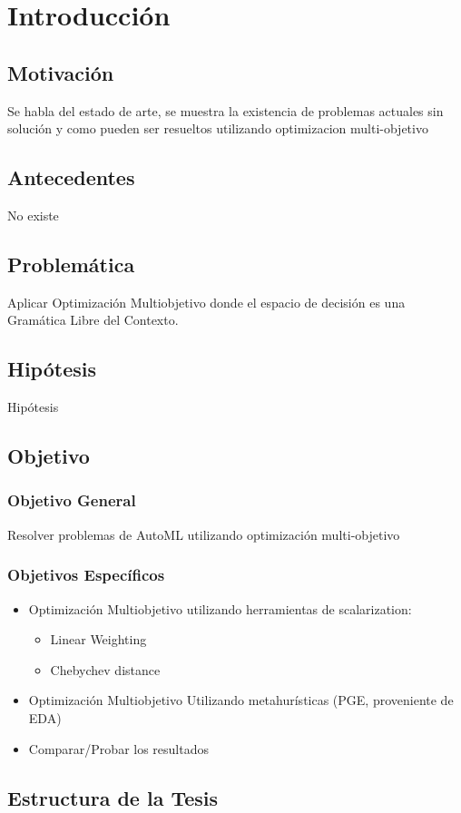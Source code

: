 \chapter*{Introducción}\label{chapter:introduction}

\section*{Motivaci\'on}
Se habla del estado de arte, se muestra la existencia de problemas actuales sin soluci\'on y como pueden ser resueltos utilizando optimizacion multi-objetivo

\section*{Antecedentes}
No existe

\section*{Problem\'atica}
Aplicar Optimizaci\'on Multiobjetivo donde el espacio de decisi\'on es una Gram\'atica Libre del Contexto.\\

\section*{Hip\'otesis}
Hip\'otesis

\section*{Objetivo}
\subsection*{Objetivo General}
Resolver problemas de AutoML utilizando optimizaci\'on multi-objetivo
\subsection*{Objetivos Espec\'ificos}
\begin{itemize}
    \item Optimizaci\'on Multiobjetivo utilizando herramientas de scalarization:
        \begin{itemize}
            \item Linear Weighting
            \item Chebychev distance
        \end{itemize}
    \item Optimizaci\'on Multiobjetivo Utilizando metahur\'isticas (PGE, proveniente de EDA)
    \item Comparar/Probar los resultados
\end{itemize}

\section*{Estructura de la Tesis}

